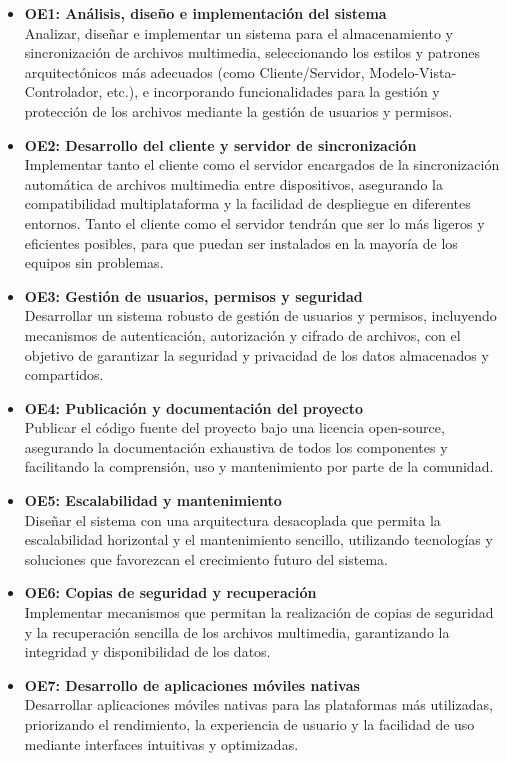 \begin{itemize}
    \item \textbf{OE1: Análisis, diseño e implementación del sistema} \\
    Analizar, diseñar e implementar un sistema para el almacenamiento y sincronización de archivos multimedia, seleccionando los estilos y patrones arquitectónicos más adecuados (como Cliente/Servidor, Modelo-Vista-Controlador, etc.), e incorporando funcionalidades para la gestión y protección de los archivos mediante la gestión de usuarios y permisos.

    \item \textbf{OE2: Desarrollo del cliente y servidor de sincronización} \\
    Implementar tanto el cliente como el servidor encargados de la sincronización automática de archivos multimedia entre dispositivos, asegurando la compatibilidad multiplataforma y la facilidad de despliegue en diferentes entornos.
    Tanto el cliente como el servidor tendrán que ser lo más ligeros y eficientes posibles, para que puedan ser instalados en la mayoría de los equipos sin problemas.

    \item \textbf{OE3: Gestión de usuarios, permisos y seguridad} \\
    Desarrollar un sistema robusto de gestión de usuarios y permisos, incluyendo mecanismos de autenticación, autorización y cifrado de archivos, con el objetivo de garantizar la seguridad y privacidad de los datos almacenados y compartidos.

    \item \textbf{OE4: Publicación y documentación del proyecto} \\
    Publicar el código fuente del proyecto bajo una licencia open-source, asegurando la documentación exhaustiva de todos los componentes y facilitando la comprensión, uso y mantenimiento por parte de la comunidad.

    \item \textbf{OE5: Escalabilidad y mantenimiento} \\
    Diseñar el sistema con una arquitectura desacoplada que permita la escalabilidad horizontal y el mantenimiento sencillo, utilizando tecnologías y soluciones que favorezcan el crecimiento futuro del sistema.

    \item \textbf{OE6: Copias de seguridad y recuperación} \\
    Implementar mecanismos que permitan la realización de copias de seguridad y la recuperación sencilla de los archivos multimedia, garantizando la integridad y disponibilidad de los datos.

    \item \textbf{OE7: Desarrollo de aplicaciones móviles nativas} \\
    Desarrollar aplicaciones móviles nativas para las plataformas más utilizadas, priorizando el rendimiento, la experiencia de usuario y la facilidad de uso mediante interfaces intuitivas y optimizadas.
\end{itemize}


